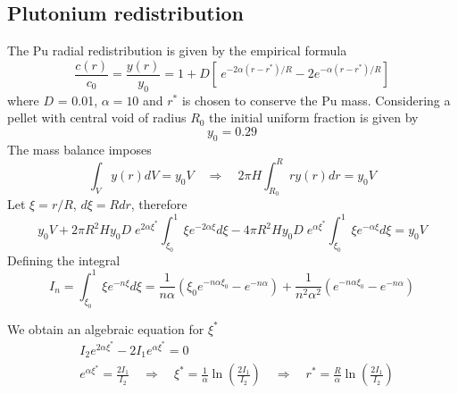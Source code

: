 \documentclass{article}
\begin{document}
\subsection{Plutonium redistribution}
The Pu radial redistribution is given by the empirical formula
\[
  \frac{c(r)}{c_0} = \frac{y(r)}{y_0} = 1 + D\left[\ e^{-2\alpha(r - r^*)/R}  - 2e^{-\alpha(r-r^*)/R} \right]
\]
where $D$ = 0.01, $\alpha = 10$ and  $r^*$ is chosen to conserve the Pu mass. Considering a pellet with central void of radius \(R_0\) the initial uniform fraction is given by
\[
  y_0 = 0.29
\]
The mass balance imposes
\[
  \int_V y(r) dV = y_0V \quad \Rightarrow \quad 2\pi H\int_{R_0}^R r y(r)dr = y_0V
\]
Let \(\xi = r/R\), \(d\xi = Rdr\), therefore
\[
  y_0V + 2\pi R^2Hy_0D\;e^{2\alpha\xi^*}\int_{\xi_0}^1 \xi e^{-2\alpha\xi}d\xi - 4\pi R^2Hy_0D\;e^{\alpha\xi^*}\int_{\xi_0}^1 \xi e^{-\alpha\xi}d\xi = y_0V
\]
Defining the integral
\[
  I_n = \int_{\xi_0}^1 \xi e^{-n\xi}d\xi = \frac{1}{n\alpha}\left( \xi_0e^{-n\alpha\xi_0} - e^{-n\alpha} \right) + \frac{1}{n^2\alpha^2}\left(e^{-n\alpha\xi_0} - e^{-n\alpha} \right)
\]

We obtain an algebraic equation for \(\xi^*\)
\begin{align*}
  & I_2e^{2\alpha\xi^*} - 2I_1e^{\alpha\xi^*} = 0\\
  & e^{\alpha\xi^*} = \frac{2I_1}{I_2}  \quad \Rightarrow \quad \xi^* = \frac{1}{\alpha}\ln\left(\frac{2I_1}{I_2}\right) \quad \Rightarrow \quad r^* = \frac{R}{\alpha}\ln\left(\frac{2I_1}{I_2}\right)
\end{align*}
\end{document}
